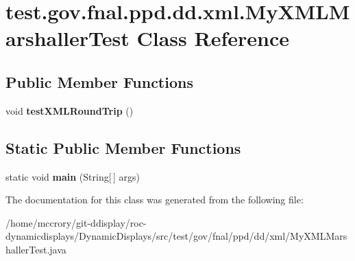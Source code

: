 \hypertarget{classtest_1_1gov_1_1fnal_1_1ppd_1_1dd_1_1xml_1_1MyXMLMarshallerTest}{\section{test.\-gov.\-fnal.\-ppd.\-dd.\-xml.\-My\-X\-M\-L\-Marshaller\-Test Class Reference}
\label{classtest_1_1gov_1_1fnal_1_1ppd_1_1dd_1_1xml_1_1MyXMLMarshallerTest}
}
\subsection*{Public Member Functions}
\begin{DoxyCompactItemize}
\item 
\hypertarget{classtest_1_1gov_1_1fnal_1_1ppd_1_1dd_1_1xml_1_1MyXMLMarshallerTest_a2c6aabb19538d73b8de668f93bf4cc74}{void {\bfseries test\-X\-M\-L\-Round\-Trip} ()}\label{classtest_1_1gov_1_1fnal_1_1ppd_1_1dd_1_1xml_1_1MyXMLMarshallerTest_a2c6aabb19538d73b8de668f93bf4cc74}

\end{DoxyCompactItemize}
\subsection*{Static Public Member Functions}
\begin{DoxyCompactItemize}
\item 
\hypertarget{classtest_1_1gov_1_1fnal_1_1ppd_1_1dd_1_1xml_1_1MyXMLMarshallerTest_aa40a509dd3eac8eedd76ad249ba8b297}{static void {\bfseries main} (String\mbox{[}$\,$\mbox{]} args)}\label{classtest_1_1gov_1_1fnal_1_1ppd_1_1dd_1_1xml_1_1MyXMLMarshallerTest_aa40a509dd3eac8eedd76ad249ba8b297}

\end{DoxyCompactItemize}


The documentation for this class was generated from the following file\-:\begin{DoxyCompactItemize}
\item 
/home/mccrory/git-\/ddisplay/roc-\/dynamicdisplays/\-Dynamic\-Displays/src/test/gov/fnal/ppd/dd/xml/My\-X\-M\-L\-Marshaller\-Test.\-java\end{DoxyCompactItemize}
